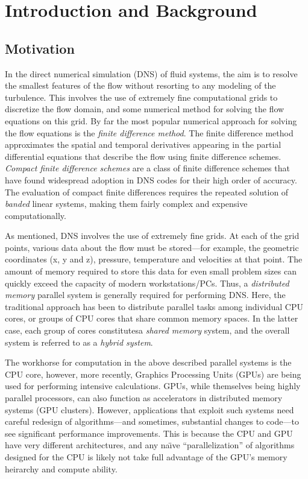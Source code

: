 \chapter{Introduction and Background}

\section{Motivation}

In the direct numerical simulation (DNS) of fluid systems,
the aim is to resolve the smallest features of the flow
without resorting to any modeling of the turbulence.
This involves the use of
extremely fine computational grids to
discretize the flow domain,
and some numerical method for solving the
flow equations on this grid.
By far the most popular numerical approach for
solving the flow equations
is the \emph{finite difference method}.
The finite difference method approximates the
spatial and temporal derivatives appearing in the
partial differential equations that describe the flow
using finite difference schemes.
\emph{Compact finite difference schemes} are a class
of finite difference schemes that have found widespread
adoption in DNS codes
for their high order of accuracy.
The evaluation of compact finite differences
requires the repeated solution of \emph{banded} linear systems,
making them fairly complex and expensive computationally.

As mentioned, DNS involves the use of extremely fine grids.
At each of the grid points,
various data about the flow must be stored---for
example, the geometric coordinates (x, y and z),
pressure, temperature and velocities at that point.
The amount of memory required to store this data
for even small problem sizes
can quickly exceed the capacity of modern workstations/PCs.
Thus, a \emph{distributed memory} parallel system
is generally required for performing DNS.
Here, the traditional approach has been
to distribute parallel tasks among individual CPU cores,
or groups of CPU cores
that share common memory spaces.
In the latter case,
each group of cores constitutesa \emph{shared memory} system,
and the overall system is referred to as a \emph{hybrid system}.

The workhorse for computation in the above described
parallel systems is the CPU core,
however, more recently,
Graphics Processing Units (GPUs)
are being used for performing intensive calculations.
GPUs, while themselves being highly parallel processors,
can also function as accelerators in distributed memory systems
(GPU clusters).
However,
applications that exploit such systems
need careful redesign of algorithms---and
sometimes, substantial changes to code---to
see significant performance improvements.
This is because the CPU and GPU have very different architectures,
and any na\"{\i}ve ``parallelization'' of algorithms
designed for the CPU
is likely not take full advantage of the GPU's
memory heirarchy and compute ability.

